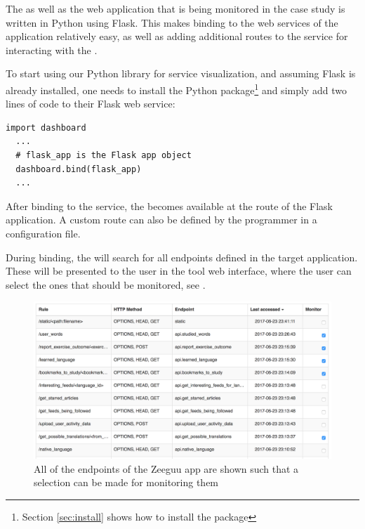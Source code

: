 \documentclass[conference]{IEEEtran}
\begin{document}
  The \tool as well as the web application that is being monitored in the case study is written in Python using Flask. This makes binding to the web services of the application relatively easy, as well as adding additional routes to the service for interacting with the \tool.

  To start using our Python library for service visualization, and assuming Flask is already installed, one needs to install the Python package\footnote{Section \ref{sec:install} shows how to install the package} 
  and simply add two lines of code to their Flask web service:

  \begin{lstlisting}[style=custompython]
  import dashboard
  ...
  # flask_app is the Flask app object
  dashboard.bind(flask_app)
  ...
  \end{lstlisting}



  After binding to the service, the \tool becomes available at the  route of the Flask application. A custom route can also be defined by the programmer in a configuration file.

  During binding, the \tool will search for all endpoints defined in the target application. These will be presented to the user in the tool web interface, where the user can select the ones that should be monitored, see . 

    \begin{figure}[h!]
      \centering
      \includegraphics[width=0.9\linewidth]{selecting_endpoints.png}
      \caption{All of the endpoints of the Zeeguu app are shown such that a selection can be made for monitoring them}
      \label{fig:sep}
    \end{figure}
\end{document}
